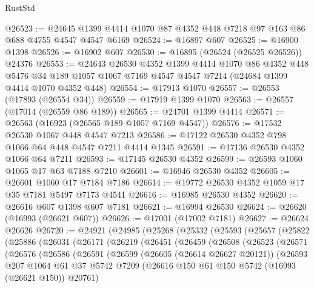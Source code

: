 \begin{lexlean}{RustStd}
\begin{coremodule}
{\begin{coremodule}
{{{{{{{{{{{{{{{{{{{{{{{{{{{{{{{{{{{{{{{{{{{{{{{{{{{{{{{@26523 := @24645 @1399 @4414 @1070 @87 @4352 @448 @7218 @97 @163 @86 @688 @4755 @4547 @4547 @6169
@26524 := @16897 @607
@26525 := @16900 @1398
@26526 := @16902 @607
@26530 := @16895 (@26524 (@26525 @26526)) @24376
@26553 := @24643
    @26530
    @4352
    @1399
    @4414
    @1070
    @86
    @4352
    @448
    @5476
    @34
    @189
    @1057
    @1067
    @7169
    @4547
    @4547
    @7214
    (@24684 @1399 @4414 @1070 @4352 @448)
@26554 := @17913 @1070
@26557 := @26553 (@17893 (@26554 @34))
@26559 := @17919 @1399 @1070
@26563 := @26557 (@17014 (@26559 @86 @189))
@26565 := @24701 @1399 @4414
@26571 := @26563 (@16923 (@26565 @189 @1057 @7169 @4547))
@26576 := @17532 @26530 @1067 @448 @4547 @7213
@26586 := @17122 @26530 @4352 @798 @1066 @64 @448 @4547 @7211 @4414 @1345
@26591 := @17136 @26530 @4352 @1066 @64 @7211
@26593 := @17145 @26530 @4352
@26599 := @26593 @1060 @1065 @17 @63 @7188 @7210
@26601 := @16946 @26530 @4352
@26605 := @26601 @1060 @17 @7184 @7186
@26614 := @19772 @26530 @4352 @1059 @17 @35 @7181 @5497 @7173 @4541
@26616 := @16985 @26530 @4352
@26620 := @26616 @607 @1398 @607 @7181
@26621 := @16994 @26530
@26624 := @26620 (@16993 (@26621 @607))
@26626 := @17001 (@17002 @7181)
@26627 := @26624 @26626
@26720 := @24921
    (@24985
      (@25268
        (@25332
          (@25593
            (@25657
              (@25822
                (@25886
                  (@26031
                    (@26171
                      (@26219
                        (@26451
                          (@26459
                            (@26508
                              (@26523
                                (@26571
                                  (@26576
                                    (@26586
                                      (@26591
                                        (@26599
                                          (@26605 (@26614 @26627 @20121))
                                          (@26593
                                            @207
                                            @1064
                                            @61
                                            @37
                                            @5742
                                            @7209
                                            (@26616
                                              @150
                                              @61
                                              @150
                                              @5742
                                              (@16993 (@26621 @150))
                                              @20761)
}}}}}}}}}}}}}}}}}}}}}}}}}}}}}}}}}}}}}}}}}}}}}}}}}}}}}}}
\end{coremodule}}
\end{coremodule}
\end{lexlean}
